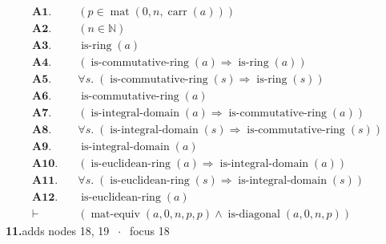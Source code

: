 \documentclass[11pt]{article}
\theoremstyle{plain}
\newcommand{\fit}[1]{\resizebox{\ifdim\width>\linewidth\linewidth\else\width\fi}{!}{#1}}
\begin{document}
\begin{align*}
  \mathbf{A1.}\quad & (p \in \operatorname{mat}(0, n, \operatorname{carr}(a))) \\
  \mathbf{A2.}\quad & (n \in \mathbb{N}) \\
  \mathbf{A3.}\quad & \operatorname{is\text{-}ring}(a) \\
  \mathbf{A4.}\quad & (\operatorname{is\text{-}commutative\text{-}ring}(a) \Rightarrow \operatorname{is\text{-}ring}(a)) \\
  \mathbf{A5.}\quad & \forall s.\; (\operatorname{is\text{-}commutative\text{-}ring}(s) \Rightarrow \operatorname{is\text{-}ring}(s)) \\
  \mathbf{A6.}\quad & \operatorname{is\text{-}commutative\text{-}ring}(a) \\
  \mathbf{A7.}\quad & (\operatorname{is\text{-}integral\text{-}domain}(a) \Rightarrow \operatorname{is\text{-}commutative\text{-}ring}(a)) \\
  \mathbf{A8.}\quad & \forall s.\; (\operatorname{is\text{-}integral\text{-}domain}(s) \Rightarrow \operatorname{is\text{-}commutative\text{-}ring}(s)) \\
  \mathbf{A9.}\quad & \operatorname{is\text{-}integral\text{-}domain}(a) \\
  \mathbf{A10.}\quad & (\operatorname{is\text{-}euclidean\text{-}ring}(a) \Rightarrow \operatorname{is\text{-}integral\text{-}domain}(a)) \\
  \mathbf{A11.}\quad & \forall s.\; (\operatorname{is\text{-}euclidean\text{-}ring}(s) \Rightarrow \operatorname{is\text{-}integral\text{-}domain}(s)) \\
  \mathbf{A12.}\quad & \operatorname{is\text{-}euclidean\text{-}ring}(a) \\
  \vdash\quad & (\operatorname{mat\text{-}equiv}(a, 0, n, p, p) \wedge \operatorname{is\text{-}diagonal}(a, 0, n, p))
\end{align*}
\medskip\noindent\textbf{11.}\quad \fit{\texttt{(di)}}\hfill{\small adds nodes 18, 19 $\;\cdot\;$ focus 18}\\[2pt]
\end{document}
